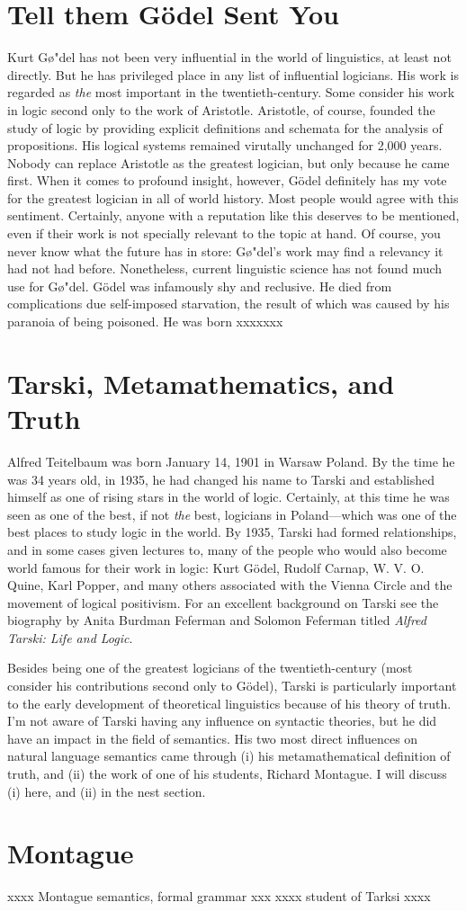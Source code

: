\section{Tell them G\"odel Sent You}
Kurt G\o"del has not been very influential in the world of linguistics, at least not directly. But he has privileged place in any list of influential logicians. His work is regarded as \textsl{the} most important in the twentieth-century. Some consider his work in logic second only to the work of Aristotle. Aristotle, of course, founded the study of logic by providing explicit definitions and schemata for the analysis of propositions. His logical systems remained virutally unchanged for 2,000 years. Nobody can replace Aristotle as the greatest logician, but only because he came first. When it comes to profound insight, however, G\"odel definitely has my vote for the greatest logician in all of world history. Most people would agree with this sentiment. Certainly, anyone with a reputation like this deserves to be mentioned, even if their work is not specially relevant to the topic at hand. Of course, you never know what the future has in store: G\o"del's work may find a relevancy it had not had before. Nonetheless, current linguistic science has not found much use for G\o"del.
G\"odel was infamously shy and reclusive. He died from complications due self-imposed starvation, the result of which was caused by his paranoia of being poisoned. He was born xxxxxxx 

\section{Tarski, Metamathematics, and Truth}
Alfred Teitelbaum was born January 14, 1901 in Warsaw Poland. By the time he was 34 years old, in 1935, he had changed his name to Tarski and established himself as one of rising stars in the world of logic. Certainly, at this time he was seen as one of the best, if not \textsl{the} best, logicians in Poland---which was one of the best places to study logic in the world. By 1935, Tarski had formed relationships, and in some cases given lectures to, many of the people who would also become world famous for their work in logic: Kurt G\"odel, Rudolf Carnap, W. V. O. Quine, Karl Popper, and many others associated with the Vienna Circle and the movement of logical positivism. For an excellent background on Tarski see the biography by Anita Burdman Feferman and Solomon Feferman titled \textsl{Alfred Tarski: Life and Logic}.

Besides being one of the greatest logicians of the twentieth-century (most consider his contributions second only to G\"odel), Tarski is particularly important to the early development of theoretical linguistics because of his theory of truth. I'm not aware of Tarski having any influence on syntactic theories, but he did have an impact in the field of semantics. His two most direct influences on natural language semantics came through (i) his metamathematical definition of truth, and (ii) the work of one of his students, Richard Montague. I will discuss (i) here, and (ii) in the nest section.
 
\section{Montague}
xxxx Montague semantics, formal grammar xxx
xxxx student of Tarksi xxxx








